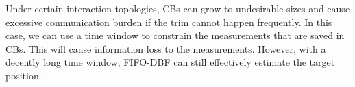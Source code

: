 	
	\begin{rem}
		Under certain interaction topologies, CBs can grow to undesirable sizes and cause excessive communication burden if the trim cannot happen frequently.
		In this case, we can use a time window to constrain the measurements that are saved in CBs.
		This will cause information loss to the measurements.
		However, with a decently long time window, FIFO-DBF can still effectively estimate the target position.
	\end{rem}